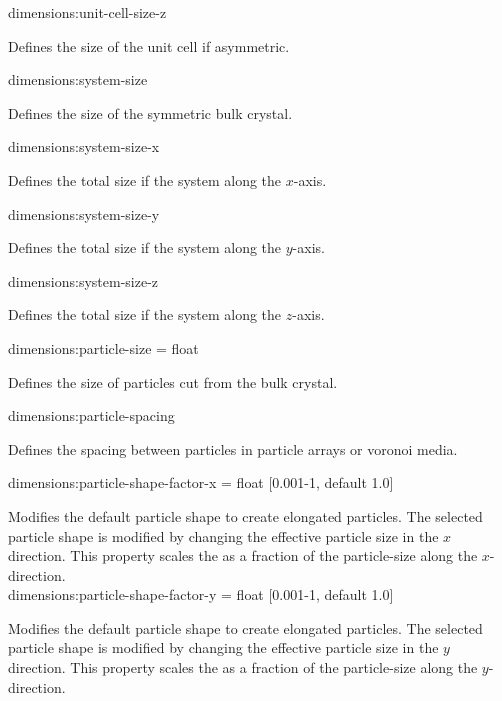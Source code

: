 {\zicf dimensions:unit-cell-size-z} Defines the size of the unit cell if asymmetric.\\ \par

{\zicf dimensions:system-size} Defines the size of the symmetric bulk crystal. \\ \par

{\zicf dimensions:system-size-x} Defines the total size if the system along the $x$-axis.\\ \par

{\zicf dimensions:system-size-y} Defines the total size if the system along the $y$-axis.\\ \par

{\zicf dimensions:system-size-z} Defines the total size if the system along the $z$-axis.\\ \par

{\zicf dimensions:particle-size = float} Defines the size of particles cut from the bulk crystal.\\ \par

{\zicf dimensions:particle-spacing} Defines the spacing between particles in particle arrays or voronoi media.\\ \par


{\zicf dimensions:particle-shape-factor-x = float [0.001-1, default 1.0]} Modifies the default particle shape to create elongated particles. The selected particle shape is modified by changing the effective particle size in the $x$ direction. This property scales the as a fraction of the particle-size along the $x$-direction.\\

{\zicf dimensions:particle-shape-factor-y = float [0.001-1, default 1.0]} Modifies the default particle shape to create elongated particles. The selected particle shape is modified by changing the effective particle size in the $y$ direction. This property scales the as a fraction of the particle-size along the $y$-direction.\\


